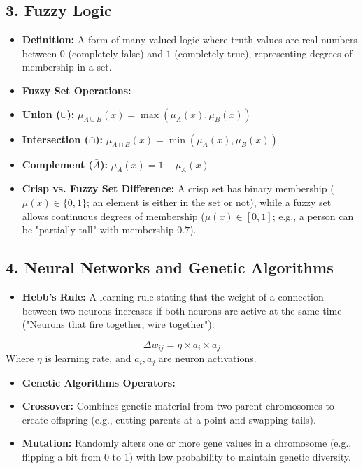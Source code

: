 \subsection{3. Fuzzy Logic}
\begin{itemize}
  \item   \textbf{Definition:} A form of many-valued logic where truth values are real numbers between $0$ (completely false) and $1$ (completely true), representing degrees of membership in a set.
  \item   \textbf{Fuzzy Set Operations:}
  \item   \textbf{Union ($\cup$):} $\mu_{A \cup B}(x) = \max(\mu_A(x), \mu_B(x))$
  \item   \textbf{Intersection ($\cap$):} $\mu_{A \cap B}(x) = \min(\mu_A(x), \mu_B(x))$
  \item   \textbf{Complement ($\bar{A}$):} $\mu_{\bar{A}}(x) = 1 - \mu_A(x)$
  \item   \textbf{Crisp vs. Fuzzy Set Difference:} A crisp set has binary membership ($\mu(x) \in \{0, 1\}$; an element is either in the set or not), while a fuzzy set allows continuous degrees of membership ($\mu(x) \in [0, 1]$; e.g., a person can be "partially tall" with membership $0.7$).
\end{itemize}


\subsection{4. Neural Networks and Genetic Algorithms}
\begin{itemize}
  \item   \textbf{Hebb's Rule:} A learning rule stating that the weight of a connection between two neurons increases if both neurons are active at the same time ("Neurons that fire together, wire together"):
\end{itemize}
    \[ \Delta w_{ij} = \eta \times a_i \times a_j \]
    Where $\eta$ is learning rate, and $a_i, a_j$ are neuron activations.
\begin{itemize}
  \item   \textbf{Genetic Algorithms Operators:}
  \item   \textbf{Crossover:} Combines genetic material from two parent chromosomes to create offspring (e.g., cutting parents at a point and swapping tails).
  \item   \textbf{Mutation:} Randomly alters one or more gene values in a chromosome (e.g., flipping a bit from 0 to 1) with low probability to maintain genetic diversity.
\end{itemize}
